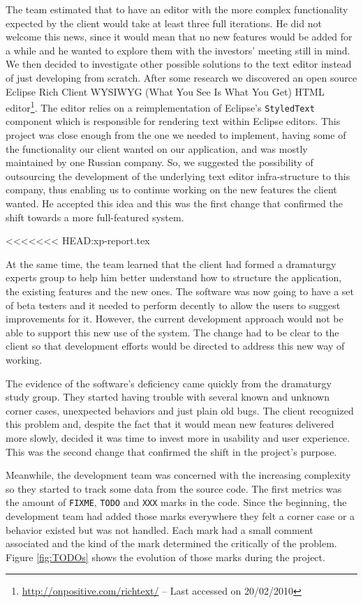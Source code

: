 \documentclass[lnbip]{svmultln}
\begin{document}
The team estimated that to have an editor with the more complex
functionality expected by the client would take at least three full
iterations. He did not welcome this news, since it would mean that no
new features would be added for a while and he wanted to explore them
with the investors' meeting still in mind.  We then decided to
investigate other possible solutions to the text editor instead of
just developing from scratch. After some research we discovered an
open source Eclipse Rich Client WYSIWYG (What You See Is What You Get)
HTML editor\footnote{\url{http://onpositive.com/richtext/} -- Last
  accessed on 20/02/2010}. The editor relies on a reimplementation of
Eclipse's \texttt{StyledText} component which is responsible for
rendering text within Eclipse editors. This project was close enough
from the one we needed to implement, having some of the functionality
our client wanted on our application, and was mostly maintained by one
Russian company. So, we suggested the possibility of outsourcing the
development of the underlying text editor infra-structure to this
company, thus enabling us to continue working on the new features the
client wanted. He accepted this idea and this was the first change
that confirmed the shift towards a more full-featured system.

<<<<<<< HEAD:xp-report.tex


At the same time, the team learned that the client had formed a
dramaturgy experts group to help him better understand how to
structure the application, the existing features and the new ones. The
software was now going to have a set of beta testers and it needed to
perform decently to allow the users to suggest improvements for
it. However, the current development approach would not be able to
support this new use of the system. The change had to be clear to the
client so that development efforts would be directed to address this
new way of working.

The evidence of the software's deficiency came quickly from the
dramaturgy study group. They started having trouble with several known
and unknown corner cases, unexpected behaviors and just plain old
bugs. The client recognized this problem and, despite the fact that it
would mean new features delivered more slowly, decided it was time to
invest more in usability and user experience. This was the second
change that confirmed the shift in the project's purpose.

Meanwhile, the development team was concerned with the increasing
complexity so they started to track some data from the source
code. The first metrics was the amount of \texttt{FIXME},
\texttt{TODO} and \texttt{XXX} marks in the code. Since the beginning,
the development team had added those marks everywhere they felt a corner
case or a behavior existed but was not handled. Each mark had a small
comment associated and the kind of the mark determined the critically
of the problem. Figure \ref{fig:TODOs} shows the evolution of those
marks during the project.
\end{document}
